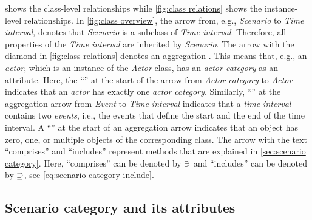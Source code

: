 \cstartd {} shows the class-level relationships while \cref{fig:class relations} shows the instance-level relationships.
In \cref{fig:class overview}, the arrow from, e.g., \textit{Scenario} to \textit{Time interval}, denotes that \textit{Scenario} is a subclass of \textit{Time interval}. Therefore, all properties of the \textit{Time interval} are inherited by \textit{Scenario}. 
The arrow with the diamond in \cref{fig:class relations} denotes an aggregation%
.
This means that, e.g., an \textit{actor}, which is an instance of the \textit{Actor} class, has an \textit{actor category} as an attribute. \cendd
Here, the ``\hasone'' at the start of the arrow from \textit{Actor category} to \textit{Actor} indicates that an \textit{actor} has \cstartd exactly \cendd one \textit{actor category}.
\cstartb Similarly, ``\hastwo'' at the aggregation arrow from \textit{Event} to \textit{Time interval} indicates that a \textit{time interval} contains two \textit{events}, i.e., the events that define the start and the end of the time interval. \cendb 
A ``\hasn'' at the start of an aggregation arrow indicates that an object has zero, one, or multiple objects of the corresponding class.
The arrow with the text ``comprises'' and ``includes'' represent methods that are explained in \cref{sec:scenario category}. Here, ``comprises'' can be denoted by $\ni$ and ``includes'' can be denoted by $\supseteq$, see \cref{eq:scenario category include}. 

\begin{figure*}
	\centering
	
	\caption{Class-level relationships of most classes of our \acf{oof}.}
	\label{fig:class overview}
\end{figure*}

\begin{figure*}[t]
	\centering
	
	\caption{Instance-level relationships of most classes of our \acf{oof}.}
	\label{fig:class relations}
\end{figure*}



\subsection{Scenario category and its attributes}
\label{sec:domain scenario category}

